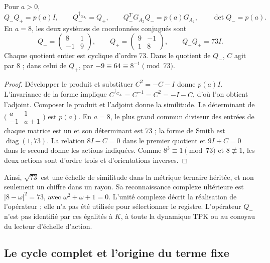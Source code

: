 \begin{proposition}
\label{lib02:norma-A2}
Pour \(a>0\),
\[
 Q_-Q_+=p(a)I,\qquad Q_-^{\dagger_{G_{A_2}}}=Q_+,
 \qquad Q_-^TG_{A_2}Q_-=p(a)G_{A_2},\qquad \det Q_-=p(a).
\]
En \(a=8\), les deux systèmes de coordonnées conjugués sont
\[
 Q_-=
 \begin{pmatrix}8&1\\-1&9\end{pmatrix},\qquad
 Q_+=\begin{pmatrix}9&-1\\1&8\end{pmatrix},\qquad Q_-Q_+=73I.
\]
Chaque quotient entier est cyclique d’ordre 73. Dans le quotient de \(Q_-\),
\(C\) agit par \(8\) ; dans celui de \(Q_+\), par
\(-9\equiv64\equiv8^{-1}\pmod{73}\).
\end{proposition}
\begin{proof}
Développer le produit et substituer \(C^2=-C-I\) donne \(p(a)I\).
L’invariance de la forme implique
\(C^{\dagger_{G_{A_2}}}=C^{-1}=C^2=-I-C\), d’où l’on obtient
l’adjoint. Composer le produit et l’adjoint donne la similitude. Le déterminant
de \(\bigl(\begin{smallmatrix}a&1\\-1&a+1\end{smallmatrix}\bigr)\) est \(p(a)\). En \(a=8\), le plus grand commun diviseur des entrées de chaque matrice est un et son déterminant est 73 ; la forme de Smith est \(\operatorname{diag}(1,73)\). La relation \(8I-C=0\) dans le premier quotient et \(9I+C=0\) dans le second donne les actions indiquées. Comme \(8^3\equiv1\pmod{73}\) et \(8\not\equiv1\), les deux actions sont d'ordre trois et d'orientations inverses.
\end{proof}

Ainsi, \(\sqrt{73}\) est une échelle de similitude dans la métrique ternaire
héritée, et non seulement un chiffre dans un rayon. Sa reconnaissance complexe
ultérieure est \(|8-\omega|^2=73\), avec
\(\omega^2+\omega+1=0\). L’unité complexe décrit la réalisation
de l’opérateur ; elle n’a pas été utilisée pour sélectionner le registre. L’opérateur
\(Q_-\) n’est pas identifié par ces égalités à \(K\), à toute
la dynamique TPK ou au conoyau du lecteur d’échelle d’action.

\subsection{Le cycle complet et l’origine du terme fixe}
\label{lib02:ciclo-completo}

